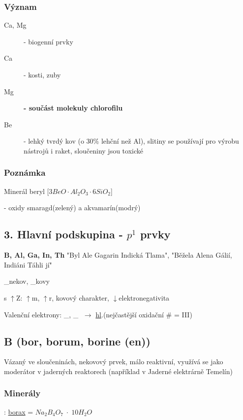     \subsubsection{Význam}
    \begin{description}
        \item[Ca, Mg] - biogenní prvky
        \item[Ca] - kosti, zuby
        \item[Mg] \textbf{- součást molekuly chlorofilu}
        \item[Be] - lehký tvrdý kov (o 30\% lehční než Al), slitiny se používají pro výrobu nástrojů i raket, sloučeniny jsou toxické
    \end{description}

    \subsubsection{Poznámka}
    Minerál beryl [$3BeO \cdot Al_2O_3 \cdot 6SiO_2$]

    - oxidy smaragd(zelený) a akvamarín(modrý)

\subsection{3. Hlavní podskupina - $p^1$ prvky}
\textbf{B, Al, Ga, In, Th}
"Byl Ale Gagarin Indická Tlama", "Běžela Alena Gálií, Indiáni Táhli jí"

_{nekov}, _{kovy}

s $\uparrow$Z: $\uparrow$m, $\uparrow$r, kovový charakter, $\downarrow$elektronegativita

Valenční elektrony: 
_{\fbox{$\uparrow\downarrow$}}, _{\fbox{$\downarrow\phantom{\uparrow}$}\fbox{\phantom{$\downarrow\uparrow$}}\fbox{\phantom{$\downarrow\uparrow$}}}
$\; \rightarrow$ \underline{hl}.(nejčastější oxidační \# = III)

\subsection{B (bor, borum, borine (en))}
Vázaný ve sloučeninách, nekovový prvek, málo reaktivní, využívá se jako moderátor v jaderných reaktorech (například v Jaderné elektrárně Temelín)

\subsubsection{Minerály}: \underline{borax} = $Na_2B_4O_7 \; \cdot \; 10H_2O$

